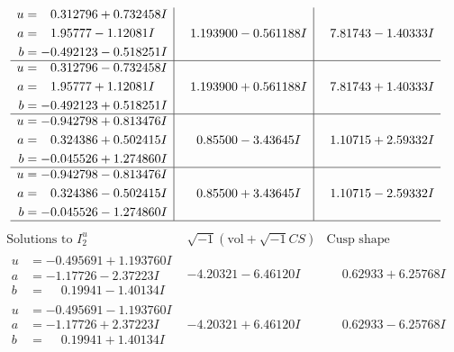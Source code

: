 \documentclass[1p]{elsarticle_modified}
\theoremstyle{definition}
\newcommand{\I}{\sqrt{-1}}
\begin{document}
$$\begin{array}{c|c|c}
\begin{aligned}
u &= \phantom{-}0.312796 + 0.732458 I \\
a &= \phantom{-}1.95777 - 1.12081 I \\
b &= -0.492123 - 0.518251 I\end{aligned}
 & \phantom{-}1.193900 - 0.561188 I & \phantom{-}7.81743 - 1.40333 I \\ \hline\begin{aligned}
u &= \phantom{-}0.312796 - 0.732458 I \\
a &= \phantom{-}1.95777 + 1.12081 I \\
b &= -0.492123 + 0.518251 I\end{aligned}
 & \phantom{-}1.193900 + 0.561188 I & \phantom{-}7.81743 + 1.40333 I \\ \hline\begin{aligned}
u &= -0.942798 + 0.813476 I \\
a &= \phantom{-}0.324386 + 0.502415 I \\
b &= -0.045526 + 1.274860 I\end{aligned}
 & \phantom{-}0.85500 - 3.43645 I & \phantom{-}1.10715 + 2.59332 I \\ \hline\begin{aligned}
u &= -0.942798 - 0.813476 I \\
a &= \phantom{-}0.324386 - 0.502415 I \\
b &= -0.045526 - 1.274860 I\end{aligned}
 & \phantom{-}0.85500 + 3.43645 I & \phantom{-}1.10715 - 2.59332 I\\
 \hline 
 \end{array}$$\newpage$$\begin{array}{c|c|c}  
\text{Solutions to }I^u_{2}& \I (\text{vol} + \sqrt{-1}CS) & \text{Cusp shape}\\
 \hline 
\begin{aligned}
u &= -0.495691 + 1.193760 I \\
a &= -1.17726 - 2.37223 I \\
b &= \phantom{-}0.19941 - 1.40134 I\end{aligned}
 & -4.20321 - 6.46120 I & \phantom{-}0.62933 + 6.25768 I \\ \hline\begin{aligned}
u &= -0.495691 - 1.193760 I \\
a &= -1.17726 + 2.37223 I \\
b &= \phantom{-}0.19941 + 1.40134 I\end{aligned}
 & -4.20321 + 6.46120 I & \phantom{-}0.62933 - 6.25768 I \\ \hline\begin{aligned}

\end{aligned}
\end{array}$$
\end{document}
